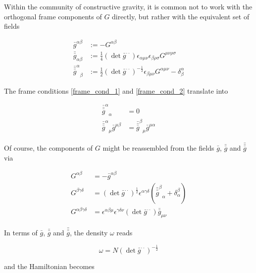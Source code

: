 \documentclass[11pt]{article}
\begin{document}
Within the community of constructive gravity, it is common not to work with the orthogonal frame components of $G$ directly, but rather with the equivalent set of fields

\begin{align}
	\bar{g}^{\alpha \beta} 
	&:= - G^{\alpha \beta}\\
	\bar{\bar{g}}_{\alpha \beta}
	&:= \frac{1}{4}\left( \det{\bar{g}^{\cdot \cdot}} \right)
	\epsilon_{\alpha \mu \nu} \epsilon_{\beta \rho \sigma}
	G^{\mu \nu \rho \sigma}\\
	{\bar{\bar{\bar{g}}}^\alpha}_\beta
	&:= \frac{1}{2}\left( \det{\bar{g}^{\cdot \cdot}} \right)^{-\frac{1}{2}}
	\epsilon_{\beta \mu \nu} G^{\alpha \mu \nu}
	 - \delta^\alpha_\beta
\end{align}

The frame conditions \ref{frame_cond_1} and \ref{frame_cond_2} translate into

\begin{align}
	{\bar{\bar{\bar{g}}}^\alpha}_\alpha  &= 0 \\
	{\bar{\bar{\bar{g}}}^\alpha}_\mu \bar{g}^{\mu \beta} 
	&= {\bar{\bar{\bar{g}}}^\beta}_\mu \bar{g}^{\mu \alpha} 
\end{align}

Of course, the components of $G$ might be reassembled from the fields $\bar{g}$, $\bar{\bar{g}}$ and $\bar{\bar{\bar{g}}}$ via

\begin{align}
	G^{\alpha \beta} &= - \bar{g}^{\alpha \beta} \\
	G^{\beta \gamma \delta} 
	&= \left( \det{\bar{g}^{\cdot \cdot}} \right)^{\frac{1}{2}}
	\epsilon^{\alpha \gamma \delta} 
	\left( 
	{\bar{\bar{\bar{g}}}^\beta}_\alpha 
	+ \delta^\beta_\alpha 
	\right) \\
	G^{\alpha \beta \gamma \delta } &= 
	\epsilon^{\alpha \beta \mu} \epsilon^{\gamma \delta \nu}
	\left( \det{\bar{g}^{\cdot \cdot}} \right) 
	\bar{\bar{g}}_{\mu \nu}
\end{align}

In terms of $\bar{g}$, $\bar{\bar{g}}$ and $\bar{\bar{\bar{g}}}$, the density $\omega$ reads

\begin{equation}
	\omega = N \left( \det{\bar{g}^{\cdot \cdot}}\right)^{-\frac{1}{2}}
\end{equation}

and the Hamiltonian becomes
\end{document}
